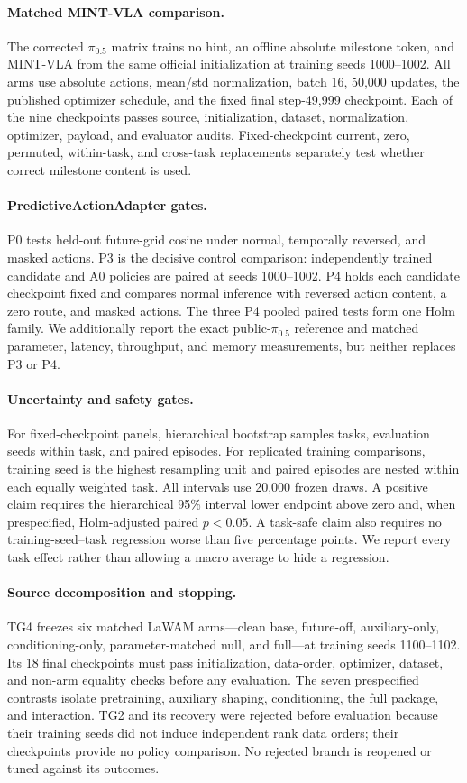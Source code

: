 \paragraph{Matched MINT-VLA comparison.}
The corrected $\pi_{0.5}$ matrix trains no hint, an offline absolute milestone
token, and MINT-VLA from the same official initialization at training seeds
1000--1002.  All arms use absolute actions, mean/std normalization, batch 16,
50,000 updates, the published optimizer schedule, and the fixed final
step-49,999 checkpoint.  Each of the nine checkpoints passes source,
initialization, dataset, normalization, optimizer, payload, and evaluator
audits.  Fixed-checkpoint current, zero, permuted, within-task, and cross-task
replacements separately test whether correct milestone content is used.

\paragraph{PredictiveActionAdapter gates.}
P0 tests held-out future-grid cosine under normal, temporally reversed, and
masked actions.  P3 is the decisive control comparison: independently trained
candidate and A0 policies are paired at seeds 1000--1002.  P4 holds each
candidate checkpoint fixed and compares normal inference with reversed action
content, a zero route, and masked actions.  The three P4 pooled paired tests
form one Holm family.  We additionally report the exact public-$\pi_{0.5}$
reference and matched parameter, latency, throughput, and memory measurements,
but neither replaces P3 or P4.

\paragraph{Uncertainty and safety gates.}
For fixed-checkpoint panels, hierarchical bootstrap samples tasks, evaluation
seeds within task, and paired episodes.  For replicated training comparisons,
training seed is the highest resampling unit and paired episodes are nested
within each equally weighted task.  All intervals use 20,000 frozen draws.  A
positive claim requires the hierarchical 95\% interval lower endpoint above
zero and, when prespecified, Holm-adjusted paired $p<0.05$.  A task-safe claim
also requires no training-seed--task regression worse than five percentage
points.  We report every task effect rather than allowing a macro average to
hide a regression.

\paragraph{Source decomposition and stopping.}
TG4 freezes six matched LaWAM arms---clean base, future-off, auxiliary-only,
conditioning-only, parameter-matched null, and full---at training seeds
1100--1102.  Its 18 final checkpoints must pass initialization, data-order,
optimizer, dataset, and non-arm equality checks before any evaluation.  The
seven prespecified contrasts isolate pretraining, auxiliary shaping,
conditioning, the full package, and interaction.  TG2 and its recovery were
rejected before evaluation because their training seeds did not induce
independent rank data orders; their checkpoints provide no policy comparison.
No rejected branch is reopened or tuned against its outcomes.

